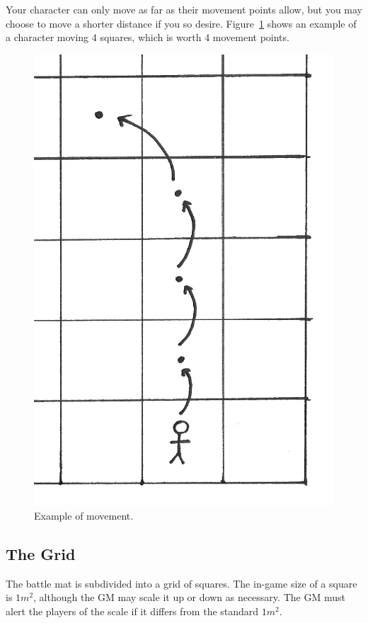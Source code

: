 Your character can only move as far as their movement points allow, but you may choose to move a shorter distance if you so desire.
Figure~\ref{fig:movement} shows an example of a character moving 4 squares, which is worth 4 movement points.

\begin{figure}
    \centering
    \includegraphics{graphics/movement-trans.png}
    \caption{Example of movement.}
    \label{fig:movement}
\end{figure}

\subsection{The Grid}
The battle mat is subdivided into a grid of squares. 
The in-game size of a square is $1m^2$, although the GM may scale it up or down as necessary.
The GM must alert the players of the scale if it differs from the standard $1m^2$.

